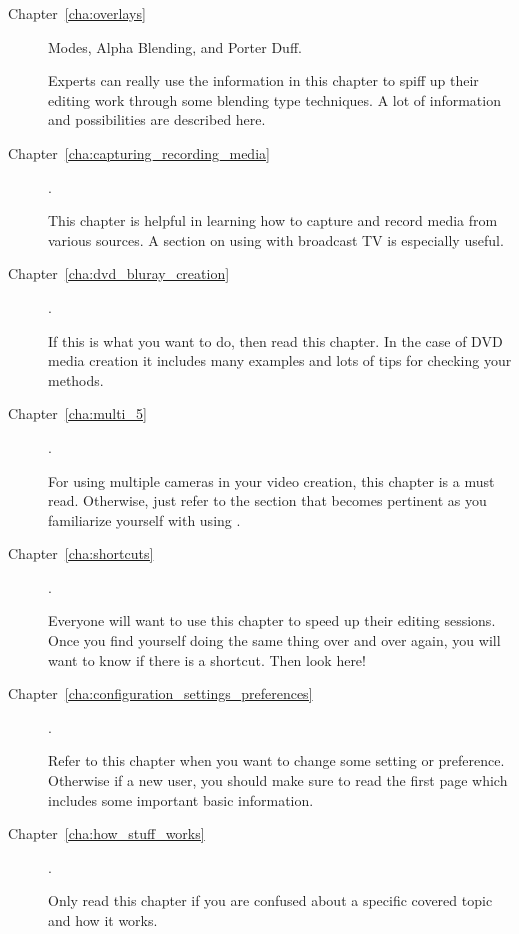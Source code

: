 \begin{description}
    \item[Chapter~\ref{cha:overlays}]  Modes, Alpha Blending, and Porter Duff.

        Experts can really use the information in this chapter to spiff up their editing work through some blending type techniques.
        A lot of information and possibilities are described here.

    \item[Chapter~\ref{cha:capturing_recording_media}] .

        This chapter is helpful in learning how to capture and record media from various sources.  A section on using \CGG{} with broadcast TV is especially useful.

    \item[Chapter~\ref{cha:dvd_bluray_creation}] .

        If this is what you want to do, then read this chapter.
        In the case of DVD media creation it includes many examples and lots of tips for checking your methods.

    \item[Chapter~\ref{cha:multi_5}] .

        For using multiple cameras in your video creation, this chapter is a must read. Otherwise, just refer
        to the section that becomes pertinent as you familiarize yourself with using \CGG{}.

    \item[Chapter~\ref{cha:shortcuts}] .

        Everyone will want to use this chapter to speed up their editing sessions.
        Once you find yourself doing the same thing over and over again, you will want to know if there is a shortcut. Then look here!

    \item[Chapter~\ref{cha:configuration_settings_preferences}] .

        Refer to this chapter when you want to change some setting or preference.
        Otherwise if a new user, you should make sure to read the first page which includes some important basic information.

    \item[Chapter~\ref{cha:how_stuff_works}] .

        Only read this chapter if you are confused about a specific covered topic and how it works.


\end{description}
